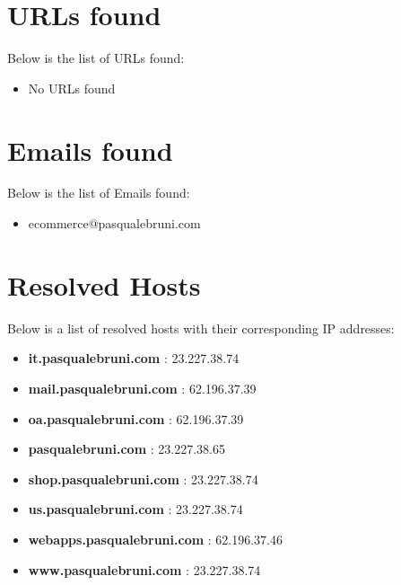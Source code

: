 \documentclass{article}
\begin{document}
\clearpage


\section{URLs found}

Below is the list of URLs found:

\begin{itemize}
    
        \item No URLs found
    
\end{itemize}

\clearpage

\section{Emails found}

Below is the list of Emails found:

\begin{itemize}
    
        
            \item ecommerce@pasqualebruni.com
        
    
\end{itemize}

\clearpage

\section{Resolved Hosts}

Below is a list of resolved hosts with their corresponding IP addresses:

\begin{itemize}
    
        
            \item \textbf{ it.pasqualebruni.com }: 23.227.38.74
        
            \item \textbf{ mail.pasqualebruni.com }: 62.196.37.39
        
            \item \textbf{ oa.pasqualebruni.com }: 62.196.37.39
        
            \item \textbf{ pasqualebruni.com }: 23.227.38.65
        
            \item \textbf{ shop.pasqualebruni.com }: 23.227.38.74
        
            \item \textbf{ us.pasqualebruni.com }: 23.227.38.74
        
            \item \textbf{ webapps.pasqualebruni.com }: 62.196.37.46
        
            \item \textbf{ www.pasqualebruni.com }: 23.227.38.74
        
    
\end{itemize}
\end{document}
